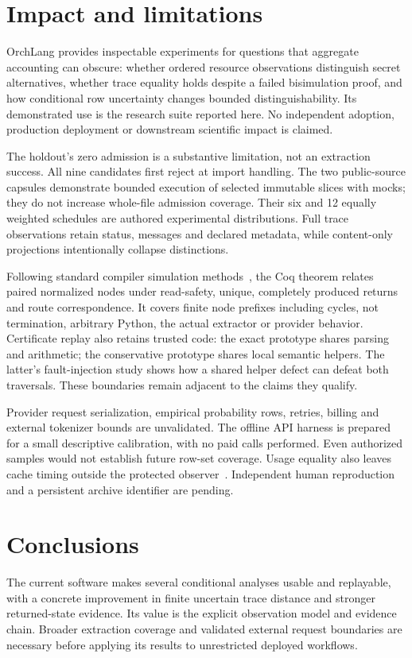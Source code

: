 \documentclass[preprint,12pt,a4paper]{elsarticle}
\begin{document}
\section{Impact and limitations}
OrchLang provides inspectable experiments for questions that aggregate accounting can obscure: whether ordered resource observations distinguish secret alternatives, whether trace equality holds despite a failed bisimulation proof, and how conditional row uncertainty changes bounded distinguishability. Its demonstrated use is the research suite reported here. No independent adoption, production deployment or downstream scientific impact is claimed.

The holdout's zero admission is a substantive limitation, not an extraction success. All nine candidates first reject at import handling. The two public-source capsules demonstrate bounded execution of selected immutable slices with mocks; they do not increase whole-file admission coverage. Their six and 12 equally weighted schedules are authored experimental distributions. Full trace observations retain status, messages and declared metadata, while content-only projections intentionally collapse distinctions.

Following standard compiler simulation methods~\cite{leroy}, the Coq theorem relates paired normalized nodes under read-safety, unique, completely produced returns and route correspondence. It covers finite node prefixes including cycles, not termination, arbitrary Python, the actual extractor or provider behavior. Certificate replay also retains trusted code: the exact prototype shares parsing and arithmetic; the conservative prototype shares local semantic helpers. The latter's fault-injection study shows how a shared helper defect can defeat both traversals. These boundaries remain adjacent to the claims they qualify.

Provider request serialization, empirical probability rows, retries, billing and external tokenizer bounds are unvalidated. The offline API harness is prepared for a small descriptive calibration, with no paid calls performed. Even authorized samples would not establish future row-set coverage. Usage equality also leaves cache timing outside the protected observer~\cite{cache}. Independent human reproduction and a persistent archive identifier are pending.

\section{Conclusions}
The current software makes several conditional analyses usable and replayable, with a concrete improvement in finite uncertain trace distance and stronger returned-state evidence. Its value is the explicit observation model and evidence chain. Broader extraction coverage and validated external request boundaries are necessary before applying its results to unrestricted deployed workflows.
\end{document}
